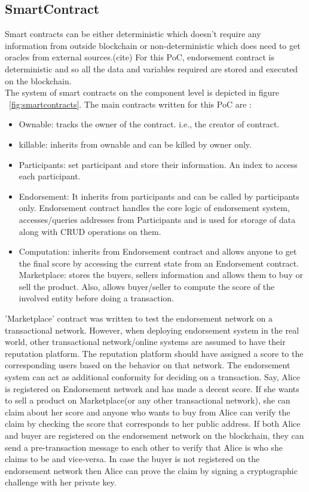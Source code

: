 \subsection{SmartContract} 
Smart contracts can be either
deterministic which doesn't require any information from outside blockchain or
non-deterministic which does need to get oracles from external sources.(cite) For
this PoC, endorsement contract is deterministic and so all the data and
variables required are stored and executed on the blockchain. \\

The system of smart contracts on the component level is depicted in figure
~\ref{fig:smartcontracts}. The main contracts written for this PoC are : 


\begin{itemize}
	\item Ownable: tracks the owner of the contract. i.e., the creator of
		contract. 
	\item killable: inherits from ownable and can be killed by owner only. 
	\item Participants: set participant and store their information. An index
		to access each participant. 
	\item Endorsement: It inherits from participants and can be called by
		participants only. Endorsement contract handles the core logic of
		endorsement system, accesses/queries addresses from Participants and is
		used for storage of data along with CRUD operations on them.  
	\item Computation: inherits from Endorsement contract and allows anyone to
		get the final score by accessing the current state from an Endorsement
		contract.
	\iitem Marketplace: stores the buyers, sellers information and allows them
		to buy or sell the product. Also, allows buyer/seller to compute the
		score of the involved entity before doing a transaction.  
\end{itemize}

'Marketplace' contract was written to test the endorsement network on a
transactional network. However, when deploying endorsement system in the real
world, other transactional network/online systems are assumed to have their
reputation platform. The reputation platform should have assigned a score to
the corresponding users based on the behavior on that network. The endorsement
system can act as additional conformity for deciding on a transaction. Say,
Alice is registered on Endorsement network and has made a decent score. If she
wants to sell a product on Marketplace(or any other transactional network), she
can claim about her score and anyone who wants to buy from Alice can verify the
claim by checking the score that corresponds to her public address. If both
Alice and buyer are registered on the endorsement network on the blockchain,
they can send a pre-transaction message to each other to verify that Alice is
who she claims to be and vice-versa. In case the buyer is not registered on the
endorsement network then Alice can prove the claim by signing a cryptographic
challenge with her private key. 

